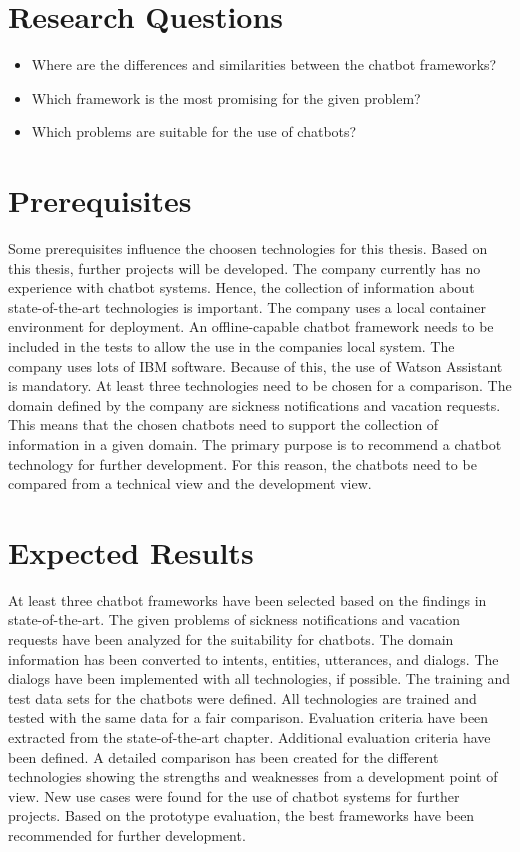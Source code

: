 \section{Research Questions}
\begin{itemize}
    \item Where are the differences and similarities between the chatbot frameworks?
    \item Which framework is the most promising for the given problem?
    \item Which problems are suitable for the use of chatbots?
\end{itemize}

\section{Prerequisites} \label{sec:prereq}
Some prerequisites influence the choosen technologies for this thesis.
Based on this thesis, further projects will be developed.
The company currently has no experience with chatbot systems.
Hence, the collection of information about state-of-the-art technologies is important.
The company uses a local container environment for deployment.
An offline-capable chatbot framework needs to be included in the tests to 
allow the use in the companies local system.
The company uses lots of IBM software.
Because of this, the use of Watson Assistant is mandatory.
At least three technologies need to be chosen for a comparison.
The domain defined by the company are sickness notifications and 
vacation requests.
This means that the chosen chatbots need to support the collection of 
information in a given domain.
The primary purpose is to recommend a chatbot technology for further development.
For this reason, the chatbots need to be compared from a technical view and the development view.


\section{Expected Results}
At least three chatbot frameworks have been selected based on the findings in state-of-the-art.
The given problems of sickness notifications and vacation requests have been analyzed for the suitability for chatbots.
The domain information has been converted to intents, entities, utterances, and dialogs.
The dialogs have been implemented with all technologies, if possible.
The training and test data sets for the chatbots were defined.
All technologies are trained and tested with the same data for a fair comparison.
Evaluation criteria have been extracted from the state-of-the-art chapter.
Additional evaluation criteria have been defined.
A detailed comparison has been created for the different technologies showing the strengths and weaknesses from a development point of view.
New use cases were found for the use of chatbot systems for further projects.
Based on the prototype evaluation, the best frameworks have been recommended for further development.